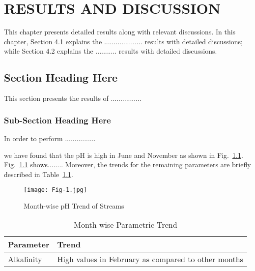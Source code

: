 \documentclass[12pt,a4paper,oneside]{book} %
\begin{document}
\chapter{RESULTS AND DISCUSSION}\label{c-results}

This chapter presents detailed results along with relevant discussions. In this chapter, Section 4.1 explains the .................... results with detailed discussions; while Section 4.2 explains the ........... results with detailed discussions.

\section{Section Heading Here}

This section presents the results of ................

\subsection{Sub-Section Heading Here}

In order to perform ................

we have found that the pH is high in June and November as shown in Fig.~\ref{fig:Fig4}.  Fig.~\ref{fig:Fig4} shows........ Moreover, the trends for the remaining parameters are briefly described in Table~\ref{table:table13}.

\begin{figure}[!t]
  \centering
  \texttt{[image: Fig-1.jpg]}
  \caption{Month-wise pH Trend of Streams}
  \label{fig:Fig4}
\end{figure}

\begin{table}[!t]
  \begin{center}\scriptsize
      \renewcommand{\arraystretch}{1.3}
      \caption{Month-wise Parametric Trend}
      \label{table:table13}
      \begin{tabular}{ll}
          \hline\hline
              {\bfseries Parameter} & {\bfseries Trend} \\
              \hline                                      %
              Alkalinity & High values in February as compared to other months\\
              \hline                          %
      \end{tabular}
  \end{center}
\end{table}
\end{document}
